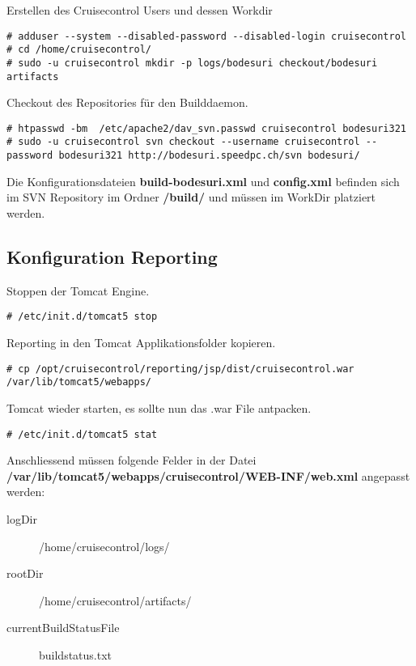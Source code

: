 \documentclass[a4paper,12pt,halfparskip,DIV14]{scrreprt}
\begin{document}
Erstellen des Cruisecontrol Users und dessen Workdir

\begin{verbatim}
# adduser --system --disabled-password --disabled-login cruisecontrol
# cd /home/cruisecontrol/
# sudo -u cruisecontrol mkdir -p logs/bodesuri checkout/bodesuri artifacts
\end{verbatim}

Checkout des Repositories für den Builddaemon. 

\begin{verbatim}
# htpasswd -bm  /etc/apache2/dav_svn.passwd cruisecontrol bodesuri321
# sudo -u cruisecontrol svn checkout --username cruisecontrol --password bodesuri321 http://bodesuri.speedpc.ch/svn bodesuri/
\end{verbatim}

Die Konfigurationsdateien \textbf{build-bodesuri.xml} und \textbf{config.xml} befinden sich im SVN Repository im Ordner \textbf{/build/} und müssen im WorkDir platziert werden.


\subsection{Konfiguration Reporting} %
\label{sub:konfiguration_reporting}

Stoppen der Tomcat Engine.

\begin{verbatim}
# /etc/init.d/tomcat5 stop
\end{verbatim}

Reporting in den Tomcat Applikationsfolder kopieren.

\begin{verbatim}
# cp /opt/cruisecontrol/reporting/jsp/dist/cruisecontrol.war /var/lib/tomcat5/webapps/
\end{verbatim}

Tomcat wieder starten, es sollte nun das .war File antpacken.

\begin{verbatim}
# /etc/init.d/tomcat5 stat
\end{verbatim}

Anschliessend müssen folgende Felder in der Datei \textbf{/var/lib/tomcat5/webapps/cruisecontrol/WEB-INF/web.xml} angepasst werden:

\begin{description}
  \item[logDir] /home/cruisecontrol/logs/
  \item[rootDir] /home/cruisecontrol/artifacts/
  \item[currentBuildStatusFile] buildstatus.txt
\end{description}
\end{document}
